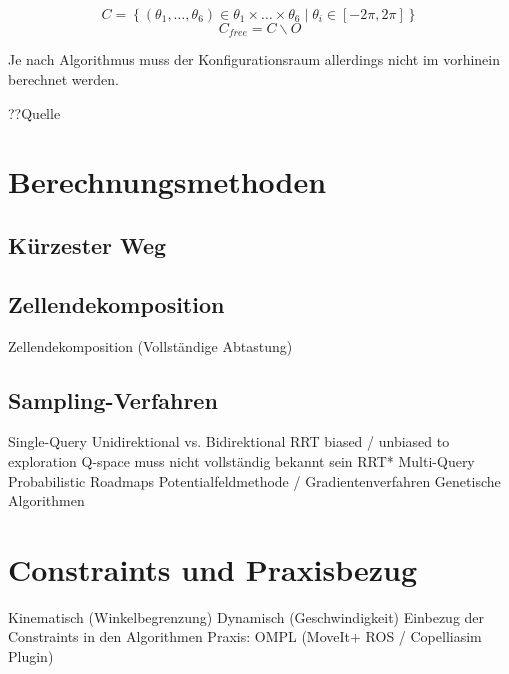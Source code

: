 \begin{equation}
    \mathit{C} = \left\{ \left( \theta_1,\dots,\theta_6 \right) \in \theta_1\times\dots\times\theta_6 \mid \theta_i \in \left[ -2\pi, 2\pi \right]\right\}
    \label{eq:config-1}
\end{equation}
\begin{equation}
    \mathit{C}_{free} = \mathit{C}\backslash\mathit{O}
    \label{eq:config-2}
\end{equation}

Je nach Algorithmus muss der Konfigurationsraum allerdings nicht im vorhinein berechnet werden.

??Quelle


\section{Berechnungsmethoden}

\subsection{Kürzester Weg}\label{subsec:kurzester-weg}

\subsection{Zellendekomposition}
Zellendekomposition (Vollständige Abtastung)

\subsection{Sampling-Verfahren}
Single-Query
Unidirektional vs. Bidirektional
RRT
biased / unbiased to exploration
Q-space muss nicht vollständig bekannt sein
RRT*
Multi-Query
Probabilistic Roadmaps
Potentialfeldmethode / Gradientenverfahren
Genetische Algorithmen


\section{Constraints und Praxisbezug}
Kinematisch (Winkelbegrenzung)
Dynamisch (Geschwindigkeit)
Einbezug der Constraints in den Algorithmen
Praxis: OMPL (MoveIt+ ROS / Copelliasim Plugin)


